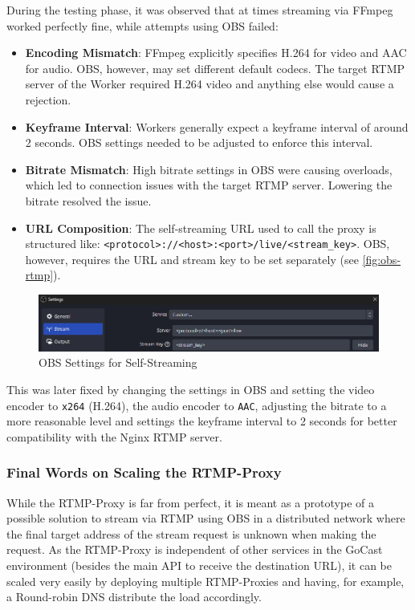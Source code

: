 During the testing phase, it was observed that at times streaming via FFmpeg worked perfectly fine, while attempts using OBS failed:
\begin{itemize}
    \item \textbf{Encoding Mismatch}: FFmpeg explicitly specifies H.264 for video and AAC for audio. OBS, however, may set different default codecs. The target \ac{RTMP} server of the Worker required H.264 video and anything else would cause a rejection.
    \item \textbf{Keyframe Interval}: Workers generally expect a keyframe interval of around 2 seconds. OBS settings needed to be adjusted to enforce this interval.
    \item \textbf{Bitrate Mismatch}: High bitrate settings in OBS were causing overloads, which led to connection issues with the target \ac{RTMP} server. Lowering the bitrate resolved the issue.
    \item \textbf{URL Composition}: The self-streaming URL used to call the proxy is structured like: \texttt{<protocol>://<host>:<port>/live/<stream\_key>}. OBS, however, requires the URL and stream key to be set separately (see \autoref{fig:obs-rtmp}).
\end{itemize}

\begin{figure}[htpb]
    \centering
    \includegraphics[width=\linewidth]{images/OBSRTMP.png}
    \caption[OBS Settings for Self-Streaming]{OBS Settings for Self-Streaming}\label{fig:obs-rtmp}
\end{figure}

This was later fixed by changing the settings in OBS and setting the video encoder to \texttt{x264} (H.264), the audio encoder to \texttt{AAC}, adjusting the bitrate to a more reasonable level and settings the keyframe interval to 2 seconds for better compatibility with the Nginx \ac{RTMP} server.

\subsubsection{Final Words on Scaling the RTMP-Proxy}

While the RTMP-Proxy is far from perfect, it is meant as a prototype of a possible solution to stream via \ac{RTMP} using OBS in a distributed network where the final target address of the stream request is unknown when making the request. As the RTMP-Proxy is independent of other services in the GoCast environment (besides the main \ac{API} to receive the destination URL), it can be scaled very easily by deploying multiple RTMP-Proxies and having, for example, a Round-robin DNS distribute the load accordingly.

